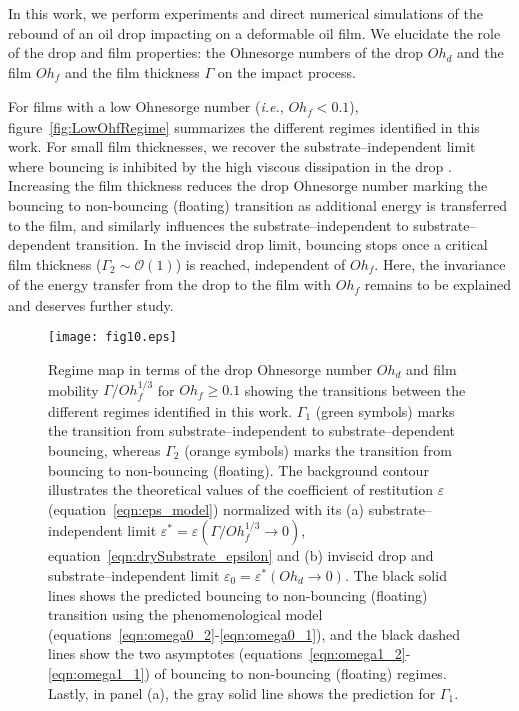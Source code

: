 \documentclass[]{jfm}
\newcommand{\Ohd}{\mathit{Oh}_\mathit{d}}
\newcommand{\Ohf}{\mathit{Oh}_\mathit{f}}
\begin{document}
In this work, we perform experiments and direct numerical simulations of the rebound of an oil drop impacting on a deformable oil film. We elucidate the role of the drop and film properties: the Ohnesorge numbers of the drop $\Ohd$ and the film $\Ohf$ and the film thickness $\Gamma$ on the impact process.

For films with a low Ohnesorge number ({\it i.e.}, $\Ohf < 0.1$), figure~\ref{fig:LowOhfRegime} summarizes the different regimes identified in this work. For small film thicknesses, we recover the substrate--independent limit  where bouncing is inhibited by the high viscous dissipation in the drop \citep[$Oh_{d,c} \sim \mathcal{O}\left(1\right)$,][]{jha2020viscous}. Increasing the film thickness reduces the drop Ohnesorge number marking the bouncing to non-bouncing (floating) transition as additional energy is transferred to the film, and similarly influences the substrate--independent to substrate--dependent transition. In the inviscid drop limit, bouncing stops once a critical film thickness ($\Gamma_2 \sim \mathcal{O}\left(1\right)$) is reached, independent of $\Ohf$. Here, the invariance of the energy transfer from the drop to the film with $\Ohf$ remains to be explained and deserves further study.


\begin{figure}
	\centering
	\texttt{[image: fig10.eps]}
	\caption{Regime map in terms of the drop Ohnesorge number $\Ohd$ and film mobility $\Gamma/\Ohf^{1/3}$ for $\Ohf \ge 0.1$ showing the transitions between the different regimes identified in this work. 
		$\Gamma_1$ (green symbols) marks the transition from substrate--independent to substrate--dependent bouncing, whereas $\Gamma_2$ (orange symbols) marks the transition from bouncing to non-bouncing (floating).
		The background contour illustrates the theoretical values of the coefficient of restitution $\varepsilon$ (equation~\eqref{eqn:eps_model}) normalized with its (a) substrate--independent limit $\varepsilon^* = \varepsilon\left(\Gamma/\Ohf^{1/3} \to 0\right)$, equation~\eqref{eqn:drySubstrate_epsilon} and (b) inviscid drop and substrate--independent limit $\varepsilon_0 = \varepsilon^*\left(\Ohd \to 0\right)$. The black solid lines shows the predicted bouncing to non-bouncing (floating) transition using the phenomenological model (equations~\eqref{eqn:omega0_2}-\eqref{eqn:omega0_1}), and the black dashed lines show the two asymptotes (equations~\eqref{eqn:omega1_2}-\eqref{eqn:omega1_1}) of bouncing to non-bouncing (floating) regimes. Lastly, in panel (a), the gray solid line shows the prediction for $\Gamma_1$.}
	\label{fig:regimeMap}
\end{figure}
\end{document}
